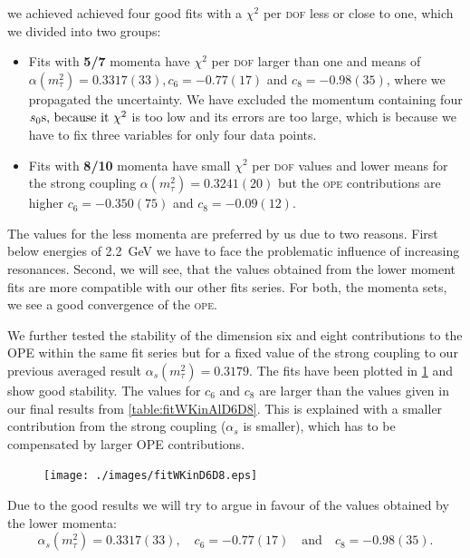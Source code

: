 \documentclass[../../index.tex]{subfiles}
\begin{document}
we achieved achieved four good fits with a \(\chi^2\) per \textsc{dof} less or close to one,
which we divided into two groups:
\begin{itemize}
\item Fits with \textbf{5\-/7} momenta have \(\chi^2\) per \textsc{dof} larger
  than one and means of \(\alpha(m_\tau^2)=0.3317(33), c_6=-0.77(17)\) and
  \(c_8=-0.98(35)\), where we propagated the uncertainty. We have excluded the
  momentum containing four \(s_0$s, because it $\chi^2\) is too low and its
  errors are too large, which is because we have to fix three variables for only
  four data points.
\item Fits with \textbf{8\-/10} momenta have small \(\chi^2\) per \textsc{dof}
  values and lower means for the strong coupling \(\alpha(m_\tau^2)=0.3241(20)\)
  but the \textsc{ope} contributions are higher \(c_6=-0.350(75)\) and
  \(c_8=-0.09(12)\).
\end{itemize}
The values for the less momenta are preferred by us due to two reasons. First
below energies of \SI{2.2}{\giga\eV} we have to face the problematic influence
of increasing resonances. Second, we will see, that the values obtained from the
lower moment fits are more compatible with our other fits series. For both, the
momenta sets, we see a good convergence of the \textsc{ope}.

We further tested the stability of the dimension six and eight contributions to
the OPE within the same fit series but for a fixed value of the strong coupling
to our previous averaged result \(\alpha_s(m_\tau^2)=0.3179\). The fits have
been plotted in \cref{fig:fitWKinD6D8} and show good stability. The values for
\(c_6\) and \(c_8\) are larger than the values given in our final results
from \cref{table:fitWKinAlD6D8}. This is explained with a smaller contribution
from the strong coupling (\(\alpha_s\) is smaller), which has to be
compensated by larger OPE contributions.
\begin{figure}
  \centering \texttt{[image: ./images/fitWKinD6D8.eps]}
  \caption{}
  \label{fig:fitWKinD6D8}
\end{figure}

Due to the good results we will try to argue in favour of the values obtained by
the lower momenta:
\begin{equation}
  \label{eq:wKinResult}
  \alpha_s(m_\tau^2) = 0.3317(33), \quad c_6 = -0.77(17) \quad \text{and} \quad
  c_8 = -0.98(35).
\end{equation}
\end{document}
